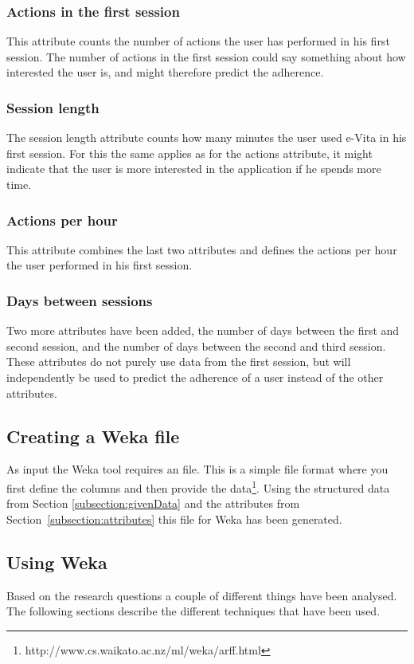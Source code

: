 \subsubsection{Actions in the first session}
This attribute counts the number of actions the user has performed in his first session. The number of actions in the first session could say something about how interested the user is, and might therefore predict the adherence.

\subsubsection{Session length}
The session length attribute counts how many minutes the user used e-Vita in his first session. For this the same applies as for the actions attribute, it might indicate that the user is more interested in the application if he spends more time.

\subsubsection{Actions per hour}
This attribute combines the last two attributes and defines the actions per hour the user performed in his first session.

\subsubsection{Days between sessions}
Two more attributes have been added, the number of days between the first and second session, and the number of days between the second and third session. These attributes do not purely use data from the first session, but will independently be used to predict the adherence of a user instead of the other attributes.

\subsection{Creating a Weka file}
As input the Weka tool requires an  file. This is a simple file format where you first define the columns and then provide the data\footnote{http://www.cs.waikato.ac.nz/ml/weka/arff.html}. Using the structured data from Section \ref{subsection:givenData} and the attributes from Section~\ref{subsection:attributes} this file for Weka has been generated.

\subsection{Using Weka} \label{subsection:usingWeka}
Based on the research questions a couple of different things have been analysed. The following sections describe the different techniques that have been used.

